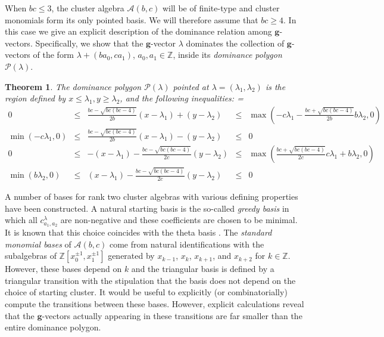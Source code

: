 \documentclass{amsart}
\newtheorem{theorem}{Theorem}
\numberwithin{theorem}{section}
\newcommand{\bfg}{\boldsymbol{g}}
\newcommand{\cA}{\mathcal{A}}
\newcommand{\cP}{\mathcal{P}}
\newcommand{\ZZ}{\mathbb{Z}}
\begin{document}
  When $bc\le3$, the cluster algebra $\cA(b,c)$ will be of finite-type and cluster monomials form its only pointed basis.
  We will therefore assume that $bc\ge4$.
  In this case we give an explicit description of the dominance relation among $\bfg$-vectors.
  Specifically, we show that the $\bfg$-vector $\lambda$ dominates the collection of $\bfg$-vectors of the form $\lambda+(b a_0 ,c a_1)$, $a_0,a_1\in\ZZ$, inside its \emph{dominance polygon} $\cP(\lambda)$.
  \begin{theorem}
    \label{th:dominance inequalities}
    The dominance polygon $\cP(\lambda)$ pointed at $\lambda=(\lambda_1,\lambda_2)$ is the region defined by $x\leq \lambda_1, y\geq\lambda_2$, and the following inequalities:
    {
      \everymath={\displaystyle}
      \def\arraystretch{2.8}
      \[
        \begin{array}{rcccl}
          0 & \leq & \frac{b c-\sqrt{b c (b c-4)}}{2 b}(x-\lambda_1)+(y-\lambda_2) & \leq & \max\left(-c\lambda_1-\frac{b c+\sqrt{b c (b c-4)}}{2b}b\lambda_2,0\right)
          \\
          \min\left(-c\lambda_1,0\right) & \leq & \frac{b c-\sqrt{b c (b c-4)}}{2 b}(x-\lambda_1)-(y-\lambda_2) & \leq & 0
          \\
          0 & \leq &  -(x-\lambda_1)-\frac{b c-\sqrt{b c (b c-4)}}{2 c}(y-\lambda_2) & \leq & \max\left(\frac{b c+\sqrt{b c (b c-4)}}{2c}c\lambda_1+b\lambda_2,0\right)
          \\
          \min\left(b \lambda_2,0\right) & \leq & (x-\lambda_1) - \frac{b c-\sqrt{b c (b c-4)}}{2 c} (y-\lambda_2) & \leq & 0
        \end{array}
      \]
    }
  \end{theorem}

  A number of bases for rank two cluster algebras with various defining properties have been constructed.
  A natural starting basis is the so-called \emph{greedy basis} in which all $c^\lambda_{a_1,a_2}$ are non-negative and these coefficients are chosen to be minimal.
  It is known that this choice coincides with the theta basis \cite{GHKK, CGMMRSW}.
  The \emph{standard monomial bases} of $\cA(b,c)$ come from natural identifications with the subalgebras of $\ZZ[x_0^{\pm1},x_1^{\pm1}]$ generated by $x_{k-1}$, $x_k$, $x_{k+1}$, and $x_{k+2}$ for $k\in\ZZ$.
  However, these bases depend on $k$ and the triangular basis is defined by a triangular transition with the stipulation that the basis does not depend on the choice of starting cluster.
  It would be useful to explicitly (or combinatorially) compute the transitions between these bases.
  However, explicit calculations reveal that the $\bfg$-vectors actually appearing in these transitions are far smaller than the entire dominance polygon.
\end{document}
